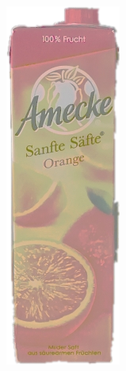 \begin{appendices}
\begin{figure}[htb]
\begin{minipage}[c]{0.2\textwidth}
\end{minipage}
\hfill
\begin{minipage}[c]{0.08\textwidth}
\includegraphics[width=\textwidth]{Sources/Bild3_HS.png}

\end{minipage}
\end{figure}
\end{appendices}
